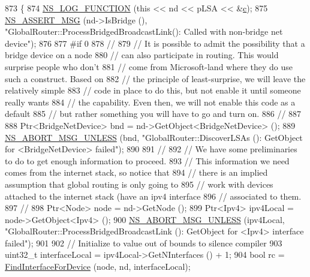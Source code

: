 \begin{DoxyCode}
873 \{
874   \hyperlink{log-macros-disabled_8h_a90b90d5bad1f39cb1b64923ea94c0761}{NS\_LOG\_FUNCTION} (\textcolor{keyword}{this} << nd << pLSA << &\hyperlink{lte_2model_2fading-traces_2fading__trace__generator_8m_ae0323a9039add2978bf5b49550572c7c}{c});
875   \hyperlink{assert_8h_aff5ece9066c74e681e74999856f08539}{NS\_ASSERT\_MSG} (nd->IsBridge (), \textcolor{stringliteral}{"GlobalRouter::ProcessBridgedBroadcastLink(): Called with
       non-bridge net device"});
876 
877 \textcolor{preprocessor}{#if 0}
878   \textcolor{comment}{//}
879   \textcolor{comment}{// It is possible to admit the possibility that a bridge device on a node}
880   \textcolor{comment}{// can also participate in routing.  This would surprise people who don't}
881   \textcolor{comment}{// come from Microsoft-land where they do use such a construct.  Based on}
882   \textcolor{comment}{// the principle of least-surprise, we will leave the relatively simple}
883   \textcolor{comment}{// code in place to do this, but not enable it until someone really wants}
884   \textcolor{comment}{// the capability.  Even then, we will not enable this code as a default}
885   \textcolor{comment}{// but rather something you will have to go and turn on.}
886   \textcolor{comment}{//}
887 
888   Ptr<BridgeNetDevice> bnd = nd->GetObject<BridgeNetDevice> ();
889   \hyperlink{group__fatal_ga0bd3f62c55e7347ff814572f3aaa3864}{NS\_ABORT\_MSG\_UNLESS} (bnd, \textcolor{stringliteral}{"GlobalRouter::DiscoverLSAs (): GetObject for
       <BridgeNetDevice> failed"});
890 
891   \textcolor{comment}{//}
892   \textcolor{comment}{// We have some preliminaries to do to get enough information to proceed.}
893   \textcolor{comment}{// This information we need comes from the internet stack, so notice that}
894   \textcolor{comment}{// there is an implied assumption that global routing is only going to }
895   \textcolor{comment}{// work with devices attached to the internet stack (have an ipv4 interface}
896   \textcolor{comment}{// associated to them.}
897   \textcolor{comment}{//}
898   Ptr<Node> node = nd->GetNode ();
899   Ptr<Ipv4> ipv4Local = node->GetObject<Ipv4> ();
900   \hyperlink{group__fatal_ga0bd3f62c55e7347ff814572f3aaa3864}{NS\_ABORT\_MSG\_UNLESS} (ipv4Local, \textcolor{stringliteral}{"GlobalRouter::ProcessBridgedBroadcastLink ():
       GetObject for <Ipv4> interface failed"});
901 
902   \textcolor{comment}{// Initialize to value out of bounds to silence compiler}
903   uint32\_t interfaceLocal = ipv4Local->GetNInterfaces () + 1;
904   \textcolor{keywordtype}{bool} rc = \hyperlink{classns3_1_1GlobalRouter_a7b30c3c09f93e3f3ac7cfe787b51d127}{FindInterfaceForDevice} (node, nd, interfaceLocal);

\end{DoxyCode}

